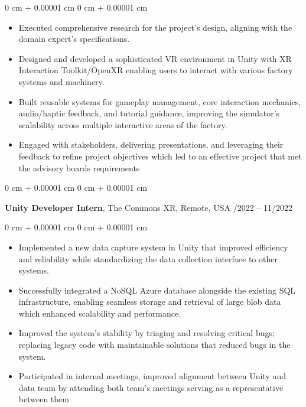 \documentclass[10pt, letterpaper]{article}
\newenvironment{highlights}{
    \begin{itemize}[
        topsep=0.10 cm,
        parsep=0.10 cm,
        partopsep=0pt,
        itemsep=0pt,
        leftmargin=0 cm + 10pt
    ]
}{
    \end{itemize}
} %
\newenvironment{onecolentry}{
    \begin{adjustwidth}{
        0 cm + 0.00001 cm
    }{
        0 cm + 0.00001 cm
    }
}{
    \end{adjustwidth}
} %
\newenvironment{twocolentry}[2][]{
    \onecolentry
    \def\secondColumn{#2}
    \setcolumnwidth{\fill, 4.5 cm}
    \begin{paracol}{2}
}{
    \switchcolumn \raggedleft \secondColumn
    \end{paracol}
    \endonecolentry
} %
\begin{document}
        \vspace{0.10 cm}
        \begin{onecolentry}
            \begin{highlights}
                \item Executed comprehensive research for the project's design, aligning with the domain expert’s specifications. 
                \item Designed and developed a sophisticated VR environment in Unity with XR Interaction Toolkit/OpenXR enabling users to interact with various factory systems and machinery.
                \item Built reusable systems for gameplay management, core interaction mechanics, audio/haptic feedback, and tutorial guidance, improving the simulator’s scalability across multiple interactive areas of the factory. 
                \item Engaged with stakeholders, delivering presentations, and leveraging their feedback to refine project objectives which led to an effective project that met the advisory boards requirements
            \end{highlights}
        \end{onecolentry}
\vspace{0.2 cm}
       \begin{twocolentry}{
             04/2022 – 11/2022
        }
        \textbf{Unity Developer Intern}, The Commons XR, Remote, USA\end{twocolentry}

        \vspace{0.10 cm}
        \begin{onecolentry}
            \begin{highlights}
                \item Implemented a new data capture system in Unity that improved efficiency and reliability while standardizing the data collection interface to other systems.  
                \item Successfully integrated a NoSQL Azure database alongside the existing SQL infrastructure, enabling seamless storage and retrieval of large blob data which enhanced scalability and performance.  
                \item Improved the system's stability by triaging and resolving critical bugs; replacing legacy code with maintainable solutions that reduced bugs in the system.
                \item Participated in internal meetings, improved alignment between Unity and data team by attending both team's meetings serving as a representative between them
            \end{highlights}
        \end{onecolentry}
\end{document}
